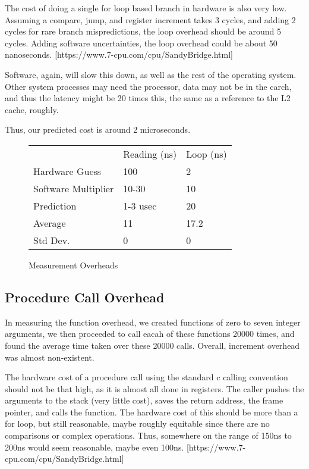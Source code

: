 \documentclass[letterpaper,twocolumn,10pt]{article}
\begin{document}
The cost of doing a single for loop based branch in hardware is also very low.
Assuming a compare, jump, and register increment takes 3 cycles, and adding
2 cycles for rare branch mispredictions, the loop overhead should be around
5 cycles. Adding software uncertainties, the loop overhead could be about
50 nanoseconds.
[https://www.7-cpu.com/cpu/SandyBridge.html]

Software, again, will slow this down, as well as the rest of the operating
system. Other system processes may need the processor, data may not be in the
carch, and thus the latency might be 20 times this, the same as a reference to
the L2 cache, roughly.

Thus, our predicted cost is around 2 microseconds.

\begin{figure}
	\centering
    \begin{tabular}{lll}
      & Reading (ns) & Loop (ns) \\
Hardware Guess  & 100 & 2\\
Software Multiplier & 10-30 & 10 \\
Prediction & 1-3 usec & 20\\
Average  & 11 & 17.2 \\
Std Dev. & 0 & 0
\end{tabular}
\caption{Measurement Overheads}
\label{tab:generaloverheads}
\end{figure}


\subsection{Procedure Call Overhead}

In measuring the function overhead, we created functions of zero to seven integer arguments,
we then proceeded to call eacah of these functions 20000
times, and found the average time taken over these 20000 calls. Overall, increment overhead was almost non-existent.

The hardware cost of a procedure call using the standard c calling convention should not be that high, as it is almost all done in registers. The caller pushes the arguments to the stack (very little cost), saves the return address, the frame pointer, and calls the function. The hardware cost of this should be more than a for loop, but still reasonable, maybe roughly equitable since there are no comparisons or complex operations. Thus, somewhere on the range of 150ns to 200ns would seem reasonable, maybe even 100ns.
[https://www.7-cpu.com/cpu/SandyBridge.html]
\end{document}
